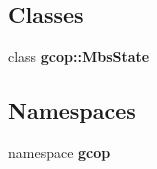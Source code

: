\subsection*{\-Classes}
\begin{DoxyCompactItemize}
\item 
class {\bf gcop\-::\-Mbs\-State}
\end{DoxyCompactItemize}
\subsection*{\-Namespaces}
\begin{DoxyCompactItemize}
\item 
namespace {\bf gcop}
\end{DoxyCompactItemize}
